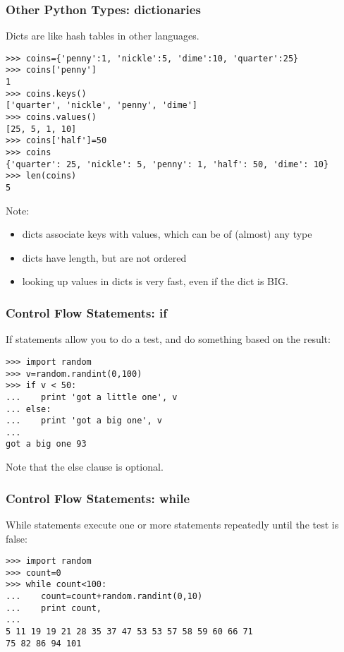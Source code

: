 \documentclass[10pt]{beamer}
\begin{document}
\begin{frame}[fragile]
\frametitle{Other Python Types: dictionaries}

Dicts are like hash tables in other languages.  
\begin{verbatim}
>>> coins={'penny':1, 'nickle':5, 'dime':10, 'quarter':25}
>>> coins['penny']
1
>>> coins.keys()
['quarter', 'nickle', 'penny', 'dime']
>>> coins.values()
[25, 5, 1, 10]
>>> coins['half']=50
>>> coins
{'quarter': 25, 'nickle': 5, 'penny': 1, 'half': 50, 'dime': 10}
>>> len(coins)
5
\end{verbatim}

Note:
\begin{itemize}
\item dicts associate keys with values, which can be of (almost) any type 
\item dicts have length, but are not ordered
\item looking up values in dicts is very fast, even if the dict is BIG.
\end{itemize}

\end{frame}

\begin{frame}[fragile]
\frametitle{Control Flow Statements: if}

If statements allow you to do a test, and do something
based on the result:

\begin{verbatim}
>>> import random
>>> v=random.randint(0,100)
>>> if v < 50:
...    print 'got a little one', v
... else:
...    print 'got a big one', v
... 
got a big one 93
\end{verbatim}

Note that the else clause is optional.

\end{frame}

\begin{frame}[fragile]
\frametitle{Control Flow Statements: while}

While statements execute one or more statements repeatedly until the 
test is false:

\begin{verbatim}
>>> import random
>>> count=0
>>> while count<100:
...    count=count+random.randint(0,10)
...    print count,
... 
5 11 19 19 21 28 35 37 47 53 53 57 58 59 60 66 71   
75 82 86 94 101 
\end{verbatim}

\end{frame}
\end{document}
